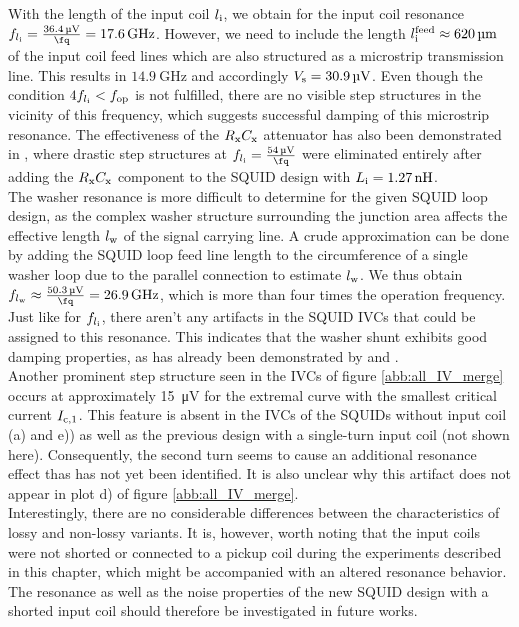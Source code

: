 With the length of the input coil $l_{\rm i}$, we obtain for the input coil resonance $f_{l_{\rm i}}=\frac{\qty{36.4}{\uV}}{\unit{\fq}}=\qty{17.6}{\GHz}$. However, we need to include the length $l_{\rm i}^{\rm feed}\approx \qty{620}{\um}$ of the input coil feed lines which are also structured as a microstrip transmission line. This results in $\qty{14.9}{\GHz}$ and accordingly $V_{\rm s}=\qty{30.9}{\uV}$. Even though the condition $4f_{l_{\rm i}}<f_{\rm op}$ is not fulfilled, there are no visible step structures in the vicinity of this frequency, which suggests successful damping of this microstrip resonance. The effectiveness of the $R_{\rm x}C_{\rm x}$ attenuator has also been demonstrated in \cite{Bauer2022}, where drastic step structures at $f_{l_{\rm i}}=\frac{\qty{54}{\uV}}{\unit{\fq}}$ were eliminated entirely after adding the $R_{\rm x}C_{\rm x}$ component to the SQUID design with $L_{\rm i}=\qty{1.27}{\nH}$. \\
The washer resonance is more difficult to determine for the given SQUID loop design, as the complex washer structure surrounding the junction area affects the effective length $l_{\rm w}$ of the signal carrying line. A crude approximation can be done by adding the SQUID loop feed line length to the circumference of a single washer loop due to the parallel connection to estimate $l_{\rm w}$. We thus obtain $f_{l_{\rm w}}\approx\frac{\qty{50.3}{\uV}}{\unit{\fq}}=\qty{26.9}{\GHz}$, which is more than four times the operation frequency. Just like for $f_{l_{\rm i}}$, there aren't any artifacts in the SQUID IVCs that could be assigned to this resonance. This indicates that the washer shunt exhibits good damping properties, as has already been demonstrated by \cite{Richter2017} and \cite{Bauer2018}. \\

Another prominent step structure seen in the IVCs of figure \ref{abb:all_IV_merge} occurs at approximately \qty{15}{\uV} for the extremal curve with the smallest critical current $I_{\rm c,1}$. This feature is absent in the IVCs of the SQUIDs without input coil (a) and e)) as well as the previous design with a single-turn input coil (not shown here). Consequently, the second turn seems to cause an additional resonance effect thas has not yet been identified. It is also unclear why this artifact does not appear in plot d) of figure \ref{abb:all_IV_merge}. 
\\
Interestingly, there are no considerable differences between the characteristics of lossy and non-lossy variants. It is, however, worth noting that the input coils were not shorted or connected to a pickup coil during the experiments described in this chapter, which might be accompanied with an altered resonance behavior. The resonance as well as the noise properties of the new SQUID design with a shorted input coil should therefore be investigated in future works.

